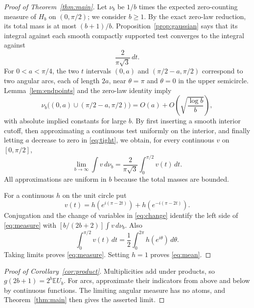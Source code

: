 \documentclass[11pt]{article}
\newcommand{\E}{\mathbb E}
\begin{document}
\begin{proof}[Proof of Theorem~\ref{thm:main}]
Let $\nu_b$ be $1/b$ times the expected zero-counting measure of $H_b$
on $(0,\pi/2)$; we consider $b\ge1$. By the exact zero-law reduction,
its total mass is at most $(b+1)/b$. Proposition~\ref{prop:gaussian}
says that its integral against each smooth compactly supported test
converges to the integral against
\[
 \frac{2}{\pi\sqrt3}\,dt.
\]
For $0<a<\pi/4$, the two $t$ intervals $(0,a)$ and
$(\pi/2-a,\pi/2)$ correspond to two angular arcs, each of length $2a$,
near $\theta=\pi$ and $\theta=0$ in the upper semicircle.
Lemma~\ref{lem:endpoints} and the zero-law identity imply
\begin{equation}\label{eq:tight}
 \nu_b\big((0,a)\cup(\pi/2-a,\pi/2)\big)
 =O(a)+O\left(\sqrt{\frac{\log b}{b}}\right),
\end{equation}
with absolute implied constants for large $b$.
By first inserting a smooth interior cutoff, then approximating a
continuous test uniformly on the interior, and finally letting $a$
decrease to zero in \eqref{eq:tight}, we obtain, for every continuous
$v$ on $[0,\pi/2]$,
\begin{equation}\label{eq:fullt}
 \lim_{b\to\infty}\int v\,d\nu_b
 =\frac{2}{\pi\sqrt3}\int_0^{\pi/2}v(t)\,dt.
\end{equation}
All approximations are uniform in $b$ because the total masses are bounded.

For a continuous $h$ on the unit circle put
\[
 v(t)=h(e^{i(\pi-2t)})+h(e^{-i(\pi-2t)}).
\]
Conjugation and the change of variables in \eqref{eq:change} identify the
left side of \eqref{eq:measure} with
$[b/(2b+2)]\int v\,d\nu_b$.
Also
\[
 \int_0^{\pi/2}v(t)\,dt
 =\frac12\int_0^{2\pi}h(e^{i\theta})\,d\theta.
\]
Taking limits proves \eqref{eq:measure}. Setting $h=1$ proves
\eqref{eq:mean}.
\end{proof}

\begin{proof}[Proof of Corollary~\ref{cor:product}]
Multiplicities add under products, so $g(2b+1)=2^b\E U_b$.
For arcs, approximate their indicators from above and below by continuous
functions. The limiting angular measure has no atoms, and
Theorem~\ref{thm:main} then gives the asserted limit.
\end{proof}
\end{document}
